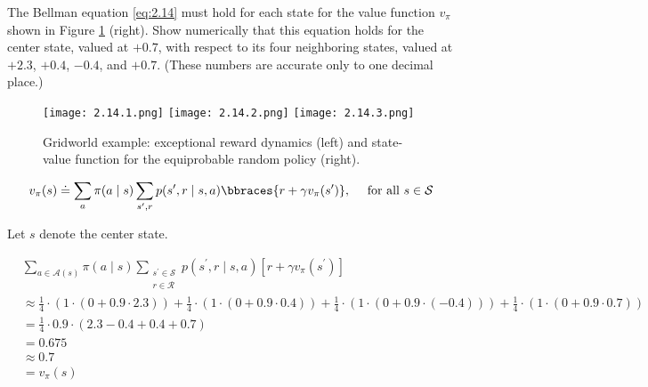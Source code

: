 
\begin{exercise}[Exercise 3.14]

The Bellman equation \eqref{eq:2.14} must hold for each state for the value function $v_\pi$ shown in Figure \ref{fig:2.14} (right). %
Show numerically that this equation holds for the center state, valued at $+0.7$, with respect to its four neighboring states, valued at $+2.3$, $+0.4$, $-0.4$, and $+0.7$.
(These numbers are accurate only to one decimal place.)

\begin{figure}[H]
    \centering
    \subfloat
    {
        \texttt{[image: 2.14.1.png]}
    }
    \hspace{1cm}
    \subfloat
    {
        \texttt{[image: 2.14.2.png]}
    }
    \hspace{1cm}
    \subfloat
    {
        \texttt{[image: 2.14.3.png]}
    }
    \hspace{0mm}
    \caption
    {
        Gridworld example:
        exceptional reward dynamics (left) and state-value function for the equiprobable random policy (right).
    }
    \label{fig:2.14}
\end{figure}

\begin{align} \label{eq:2.14}
    v_\pi(s)
    \doteq
    \sum_a
        \pi(a \mid s)
        \sum_{s^\prime, r}
            p(s^\prime, r \mid s, a)
            \bbraces{r + \gamma v_\pi(s^\prime)},
    \quad
    ~\text{for all}~ s \in \mathcal S
\end{align}

\end{exercise}


\begin{solution}

Let $s$ denote the center state.

\begin{align*}
    &
    \sum_{a \in \mathcal A(s)}
        \pi(a \mid s)
        \sum_{\substack{s^\prime \in \mathcal S \\ r \in \mathcal R}}
            p(s^\prime, r \mid s, a)
            [r + \gamma v_\pi(s^\prime)] \\
    & \approx
    \frac{1}{4} \cdot (1 \cdot (0 + 0.9 \cdot 2.3))
    +
    \frac{1}{4} \cdot (1 \cdot (0 + 0.9 \cdot 0.4))
    +
    \frac{1}{4} \cdot (1 \cdot (0 + 0.9 \cdot (-0.4)))
    +
    \frac{1}{4} \cdot (1 \cdot (0 + 0.9 \cdot 0.7)) \\
    & =
    \frac{1}{4} \cdot 0.9 \cdot (2.3 - 0.4 + 0.4 + 0.7) \\
    & =
    0.675 \\
    & \approx
    0.7 \\
    & =
    v_\pi(s)
\end{align*}

\end{solution}

